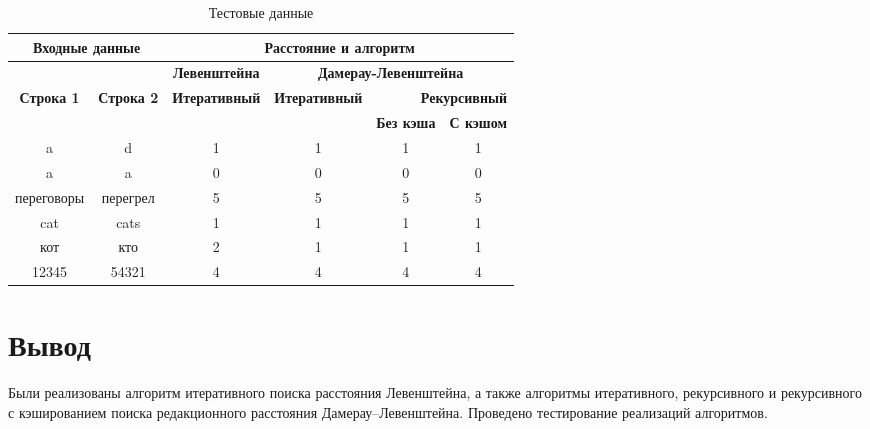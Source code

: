 \begin{table}[ht]
	\small
	\begin{center}
        \caption{\label{tbl:func_tests}Тестовые данные}
		\begin{threeparttable}
		\begin{tabular}{|c|c|c|c|c|c|}
			\hline
			\multicolumn{2}{|c|}{\bfseries Входные данные}
			& \multicolumn{4}{c|}{\bfseries Расстояние и алгоритм} \\ 
			\hline 
			&
			& \multicolumn{1}{c|}{\bfseries Левенштейна} 
			& \multicolumn{3}{c|}{\bfseries Дамерау-Левенштейна} \\ \cline{3-6}
			
			\bfseries Строка 1 & \bfseries Строка 2 & \bfseries Итеративный & \bfseries Итеративный
			
			& \multicolumn{2}{r|}{\bfseries Рекурсивный} \\ \cline{5-6}
			& & & & \bfseries Без кэша & \bfseries С кэшом \\
			\hline
			a & d & 1 & 1 & 1 & 1 \\
			\hline
			a & a & 0 & 0 & 0 & 0 \\
			\hline
			переговоры & перегрел & 5 & 5 & 5 & 5 \\
			\hline
			cat & cats & 1 & 1 & 1 & 1 \\
			\hline
			кот & кто & 2 & 1 & 1 & 1 \\
			\hline
			12345 & 54321 & 4 & 4 & 4 & 4 \\
			\hline
		\end{tabular}	
		\end{threeparttable}
	\end{center}
\end{table}

\section*{Вывод}
Были реализованы алгоритм итеративного поиска расстояния Левенштейна,
а также алгоритмы итеративного, рекурсивного и рекурсивного с кэшированием поиска редакционного расстояния Дамерау–Левенштейна. Проведено тестирование реализаций алгоритмов.

\clearpage
